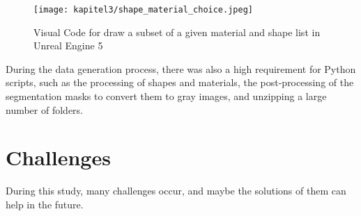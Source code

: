 		\begin{figure}[h]
			\centering
			\texttt{[image: kapitel3/shape\_material\_choice.jpeg]}
			\caption[Visual Code for draw a subset of a given material and shape list in Unreal Engine 5 by Tobia Ippolito]{Visual Code for draw a subset of a given material and shape list in Unreal Engine 5}
			\label{img:ue5_material_shape_choice}
		\end{figure}
		
		During the data generation process, there was also a high requirement for Python scripts, such as the processing of shapes and materials, the post-processing of the segmentation masks to convert them to gray images, and unzipping a large number of folders.
		
		
		
	\section{Challenges}
	\label{sec:challenges}
		During this study, many challenges occur, and maybe the solutions of them can help in the future.\\
